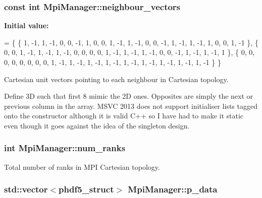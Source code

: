 \subsubsection[{\texorpdfstring{neighbour\+\_\+vectors}{neighbour_vectors}}]{\setlength{\rightskip}{0pt plus 5cm}const int Mpi\+Manager\+::neighbour\+\_\+vectors\hspace{0.3cm}{\ttfamily [static]}}\hypertarget{class_mpi_manager_a0c5f58ce12a1a8002cb124bf61e80d09}{}\label{class_mpi_manager_a0c5f58ce12a1a8002cb124bf61e80d09}
{\bfseries Initial value\+:}
\begin{DoxyCode}
= 
\{
    \{ 1, -1, 1, -1, 0, 0, -1, 1, 0, 0, 1, -1, 1, -1, 0, 0, -1, 1, -1, 1, -1, 1, 0, 0, 1, -1 \},
    \{ 0, 0, 1, -1, 1, -1, 1, -1, 0, 0, 0, 0, 1, -1, 1, -1, 1, -1, 0, 0, -1, 1, -1, 1, -1, 1 \},
    \{ 0, 0, 0, 0, 0, 0, 0, 0, 1, -1, 1, -1, 1, -1, 1, -1, 1, -1, 1, -1, 1, -1, 1, -1, 1, -1 \}
\}
\end{DoxyCode}


Cartesian unit vectors pointing to each neighbour in Cartesian topology. 

Define 3D such that first 8 mimic the 2D ones. Opposites are simply the next or previous column in the array. M\+S\+VC 2013 does not support initialiser lists tagged onto the constructor although it is valid C++ so I have had to make it static even though it goes against the idea of the singleton design. 
\subsubsection[{\texorpdfstring{num\+\_\+ranks}{num_ranks}}]{\setlength{\rightskip}{0pt plus 5cm}int Mpi\+Manager\+::num\+\_\+ranks}\hypertarget{class_mpi_manager_af5156a5e4519f43230b6b84792464e48}{}\label{class_mpi_manager_af5156a5e4519f43230b6b84792464e48}


Total number of ranks in M\+PI Cartesian topology. 

\subsubsection[{\texorpdfstring{p\+\_\+data}{p_data}}]{\setlength{\rightskip}{0pt plus 5cm}std\+::vector$<${\bf phdf5\+\_\+struct}$>$ Mpi\+Manager\+::p\+\_\+data}\hypertarget{class_mpi_manager_a03972530e718d5b0a7f119e9c6132179}{}\label{class_mpi_manager_a03972530e718d5b0a7f119e9c6132179}


